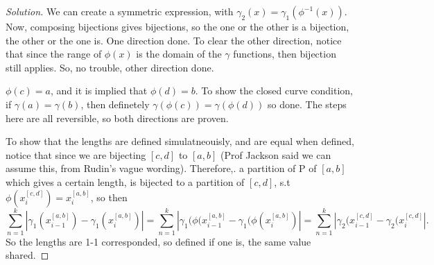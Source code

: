 \documentclass{article}
\newenvironment{solution}{\begin{proof}[Solution]}{\end{proof}}
\begin{document}
\begin{solution}
	We can create a symmetric expression, with $\gamma_{2}(x) = \gamma_{1}(\phi^{-1}(x))$. Now, composing bijections gives bijections, so the one or the other is a bijection, the other or the one is. One direction done. To clear the other direction, notice that since the range of $\phi(x)$ is the domain of the $\gamma$ functions, then bijection still applies. So, no trouble, other direction done.

	$\phi(c) = a$, and it is implied that $\phi(d) = b$. To show the closed curve condition, if $\gamma(a)=\gamma(b)$, then definetely $\gamma(\phi(c))=\gamma(\phi(d))$ so done. The steps here are all reversible, so both directions are proven.

	To show that the lengths are defined simulatneouisly, and are equal when defined, notice that since we are bijecting $[c,d]$ to $[a,b]$ (Prof Jackson said we can assume this, from Rudin's vague wording). Therefore,. a partition of P of $[a,b]$ which gives a certain length, is bijected to a partition of $[c,d]$, s.t $\phi(x_{i}^{[c,d]}) = x_{i}^{[a,b]}$, so then \[
		\sum_{n = 1}^{k} |\gamma_1(x_{i-1}^{[a,b]})- \gamma_1(x_{i}^{[a,b]})| = \sum_{n=1}^{k} |\gamma_1(\phi(x_{i-1}^{[a,b]} - \gamma_{1}(\phi(x_{i}^{[a,b]})| = \sum_{n=1}^{k} |\gamma_{2}(x_{i-1}^{[c,d]}- \gamma_{2}(x_{i}^{[c,d]}|. 
	\] So the lengths are 1-1 corresponded, so defined if one is, the same value shared.
\end{solution}
\end{document}
